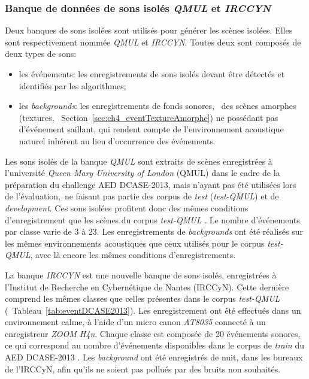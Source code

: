 \subsubsection{Banque de données de sons isolés \emph{QMUL} et \emph{IRCCYN}}
\label{sec:ch7_eventDataset}

Deux banques de sons isolées sont utilisés pour générer les scènes isolées. Elles sont respectivement nommée \emph{QMUL} et \emph{IRCCYN}. Toutes deux sont composés de deux types de sons:

\begin{itemize}
\item les événements: les enregistrements de sons isolés devant être détectés et identifiés par les algorithmes;
\item les \emph{backgrounds}: les enregistrements de fonds sonores, \ie~des scènes amorphes (textures, \cf~Section~\ref{sec:ch4_eventTextureAmorphe}) ne possédant pas d'événement saillant, qui rendent compte de l’environnement acoustique naturel inhérent au lieu d'occurrence des événements. 
\end{itemize}

Les sons isolés de la banque \emph{QMUL} sont extraits de scènes enregistrées à l'université \emph{Queen Mary University of London} (QMUL) dans le cadre de la préparation du challenge AED DCASE-2013, mais n'ayant pas été utilisées lors de l'évaluation,~\ie ne faisant pas partie des corpus de \emph{test} (\emph{test-QMUL}) et de \emph{development}. Ces sons isolées profitent donc des mêmes conditions d’enregistrement que les scènes du corpus \emph{test-QMUL} \citep{Giannoulis:2013a}. Le nombre d'événements par classe varie de 3 à 23. Les enregistrements de \emph{backgrounds} ont été réalisés sur les mêmes environnements acoustiques que ceux utilisés pour le corpus \emph{test-QMUL}, avec là encore les mêmes conditions d'enregistrements.

La banque \emph{IRCCYN} est une nouvelle banque de sons isolés, enregistrées à l'Institut de Recherche en Cybernétique de Nantes (IRCCyN). Cette dernière comprend les mêmes classes que celles présentes dans le corpus \emph{test-QMUL} (\cf~Tableau~\ref{tab:eventDCASE2013}). Les enregistrement ont été effectués dans un environnement calme, à l'aide d'un micro canon \emph{AT8035} connecté à un enregistreur \emph{ZOOM H4n}. Chaque classe est composée de 20 événements sonores, ce qui correspond au nombre d'événements disponibles dans le corpus de \emph{train} du AED DCASE-2013 \citep{Giannoulis:2013a}. Les \emph{background} ont été enregistrés de nuit, dans les bureaux de l'IRCCyN, afin qu'ils ne soient pas pollués par des bruits non souhaités. \\

